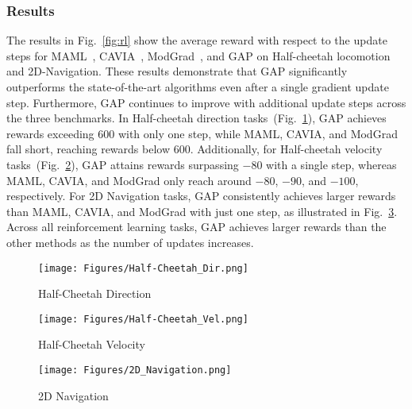 \subsubsection{Results}
The results in Fig.~\ref{fig:rl} show the average reward with respect to the update steps for MAML~\cite{finn2017model}, CAVIA~\cite{zintgraf2019fast}, ModGrad~\cite{simon2020modulating}, and GAP on Half-cheetah locomotion and 2D-Navigation.
These results demonstrate that GAP significantly outperforms the state-of-the-art algorithms even after a single gradient update step. Furthermore, GAP continues to improve with additional update steps across the three benchmarks. 
In Half-cheetah direction tasks~(Fig.~\ref{fig:rl_a}), GAP achieves rewards exceeding 600 with only one step, while MAML, CAVIA, and ModGrad fall short, reaching rewards below 600. 
Additionally, for Half-cheetah velocity tasks~(Fig.~\ref{fig:rl_b}), GAP attains rewards surpassing $-80$ with a single step, whereas MAML, CAVIA, and ModGrad only reach around $-80$, $-90$, and $-100$, respectively. 
For 2D Navigation tasks, GAP consistently achieves larger rewards than MAML, CAVIA, and ModGrad with just one step, as illustrated in Fig.~\ref{fig:rl_c}. 
Across all reinforcement learning tasks, GAP achieves larger rewards than the other methods as the number of updates increases.

\begin{figure*}[!t]
\centering
\begin{subfigure}{0.3\textwidth}
    \texttt{[image: Figures/Half-Cheetah\_Dir.png]}
    \caption{Half-Cheetah Direction}
    \label{fig:rl_a}
\end{subfigure}
\begin{subfigure}{0.3\textwidth}
    \texttt{[image: Figures/Half-Cheetah\_Vel.png]}
    \caption{Half-Cheetah Velocity}
    \label{fig:rl_b}
\end{subfigure}
\begin{subfigure}{0.3\textwidth}
    \texttt{[image: Figures/2D\_Navigation.png]}
    \caption{2D Navigation}
    \label{fig:rl_c}
\end{subfigure}
\caption{The average reward performance of MAML family and GAP models for reinforcement learning on half-cheetah direction, half-cheetah velocity, and 2D navigation. We report the performance as the number of gradient updates increases.}
\label{fig:rl}
\end{figure*}